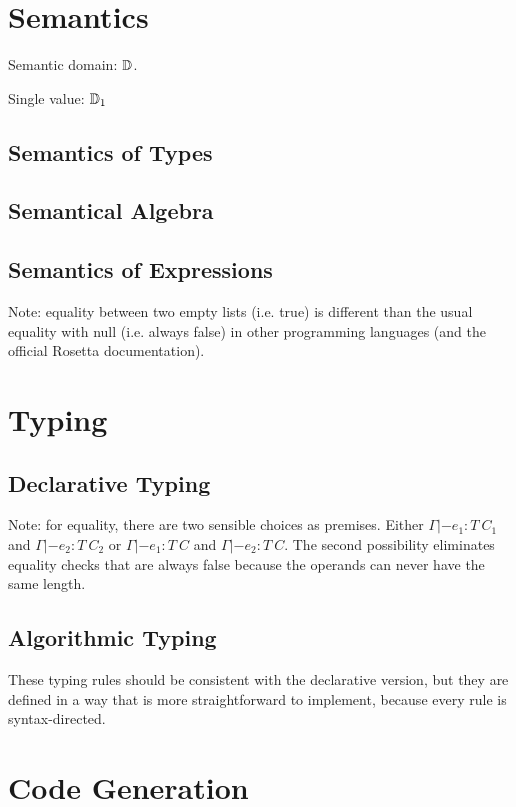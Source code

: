 \documentclass[english,11pt,a4paper]{article}
\begin{document}
\section{Semantics}

Semantic domain: $\mathbb{D}$.

Single value: $\mathbb{D}_1$

\subsection{Semantics of Types}


\subsection{Semantical Algebra}


\subsection{Semantics of Expressions}


Note: equality between two empty lists (i.e. true) is different than the usual equality with null (i.e. always false) in other programming languages (and the official Rosetta documentation).


\section{Typing}

\subsection{Declarative Typing}



Note: for equality, there are two sensible choices as premises. Either $\Gamma |- e_1 : T\ C_1$ and $\Gamma |- e_2 : T\ C_2$ or $\Gamma |- e_1 : T\ C$ and $\Gamma |- e_2 : T\ C$. The second possibility eliminates equality checks that are always false because the operands can never have the same length.

\subsection{Algorithmic Typing}

These typing rules should be consistent with the declarative version, but they are defined in a way that is more straightforward to implement, because every rule is syntax-directed.



\section{Code Generation}


\end{document}
